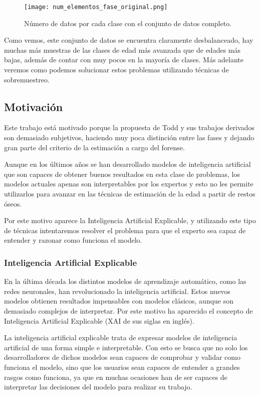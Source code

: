\begin{figure}[H]
	\centering
	\texttt{[image: num\_elementos\_fase\_original.png]}
	\caption{Número de datos por cada clase con el conjunto de datos completo.}
	\label{fig:conteo_original}

\end{figure}

Como vemos, este conjunto de datos se encuentra claramente desbalanceado, hay muchas más muestras de las clases de edad más avanzada que de edades más bajas, además de contar con muy pocos en la mayoría de clases. Más adelante veremos como podemos solucionar estos problemas utilizando técnicas de sobremuestreo.

\subsection{Motivación}

Este trabajo está motivado porque la propuesta de Todd y sus trabajos derivados son demasiado subjetivos, haciendo muy poca distinción entre las fases y dejando gran parte del criterio de la estimación a cargo del forense.

Aunque en los últimos años se han desarrollado modelos de inteligencia artificial que son capaces de obtener buenos resultados en esta clase de problemas, los modelos actuales apenas son interpretables por los expertos y esto no les permite utilizarlos para avanzar en las técnicas de estimación de la edad a partir de restos óseos.

Por este motivo aparece la Inteligencia Artificial Explicable, y utilizando este tipo de técnicas intentaremos resolver el problema para que el experto sea capaz de entender y razonar como funciona el modelo.


\subsubsection{Inteligencia Artificial Explicable}

En la última década los distintos modelos de aprendizaje automático, como las redes neuronales, han revolucionado la inteligencia artificial. Estos nuevos modelos obtienen resultados impensables con modelos clásicos, aunque son demasiado complejos de interpretar. Por este motivo ha aparecido el concepto de Inteligencia Artificial Explicable \cite{XAI} (XAI de sus siglas en inglés).

La inteligencia artificial explicable trata de expresar modelos de inteligencia artificial de una forma simple e interpretable. Con esto se busca que no solo los desarrolladores de dichos modelos sean capaces de comprobar y validar como funciona el modelo, sino que los usuarios sean capaces de entender a grandes rasgos como funciona, ya que en muchas ocasiones han de ser capaces de interpretar las decisiones del modelo para realizar su trabajo.

